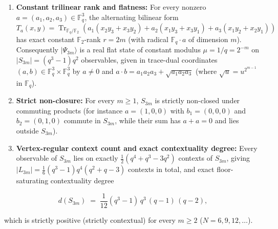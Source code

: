 \documentclass[11pt,a4paper]{article}
\providecommand{\tightlist}{\setlength{\itemsep}{0pt}\setlength{\parskip}{0pt}}
\begin{document}
\begin{enumerate}
\def\labelenumi{\arabic{enumi}.}
\tightlist
\item
  \textbf{Constant trilinear rank and flatness:} For every nonzero \(a = (a_1, a_2, a_3) \in \mathbb{F}_q^3\),
  the alternating bilinear form \(T_a(x, y) = \operatorname{Tr}_{\mathbb{F}_q/\mathbb{F}_2}(a_1(x_2 y_3 + x_3 y_2) + a_2(x_1 y_3 + x_3 y_1) + a_3(x_1 y_2 + x_2 y_1))\)
  has exact constant \(\mathbb{F}_2\)-rank \(r = 2m\) (with radical \(\mathbb{F}_q \cdot a\) of dimension \(m\)).
  Consequently \(|\Psi_{3m}\rangle\) is a real flat state of constant modulus \(\mu = 1/q = 2^{-m}\) on
  \(|S_{3m}| = (q^3 - 1)q^2\) observables, given in trace-dual coordinates \((a, b) \in \mathbb{F}_q^3 \times \mathbb{F}_q^3\)
  by \(a \ne 0\) and \(a \cdot b = a_1 a_2 a_3 + \sqrt{a_1 a_2 a_3}\) (where \(\sqrt{u} = u^{2^{m-1}}\) in
  \(\mathbb{F}_q\)).
\item
  \textbf{Strict non-closure:} For every \(m \ge 1\), \(S_{3m}\) is strictly non-closed under commuting products
  (for instance \(a = (1, 0, 0)\) with \(b_1 = (0, 0, 0)\) and \(b_2 = (0, 1, 0)\) commute in \(S_{3m}\), while
  their sum has \(a + a = 0\) and lies outside \(S_{3m}\)).
\item
  \textbf{Vertex-regular context count and exact contextuality degree:} Every observable of \(S_{3m}\) lies on
  exactly \(\tfrac12(q^4 + q^3 - 3q^2)\) contexts of \(S_{3m}\), giving
  \(|L_{3m}| = \tfrac16(q^3 - 1)q^4(q^2 + q - 3)\) contexts in total, and exact floor-saturating
  contextuality degree
\end{enumerate}

\[d(S_{3m}) \;=\; \frac{1}{12}(q^3 - 1)\,q^3\,(q - 1)\,(q - 2) ,\]

which is strictly positive (strictly contextual) for every \(m \ge 2\) (\(N = 6, 9, 12, \ldots\)).
\end{document}
